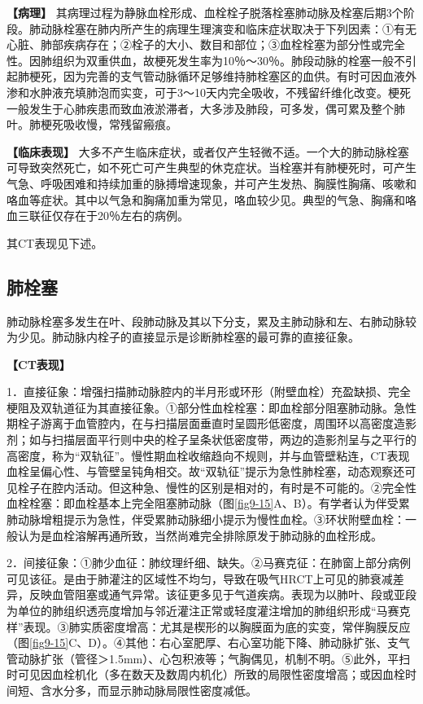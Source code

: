 \textbf{【病理】}
其病理过程为静脉血栓形成、血栓栓子脱落栓塞肺动脉及栓塞后期3个阶段。肺动脉栓塞在肺内所产生的病理生理演变和临床症状取决于下列因素：①有无心脏、肺部疾病存在；②栓子的大小、数目和部位；③血栓栓塞为部分性或完全性。因肺组织为双重供血，故梗死发生率为10％～30％。肺段动脉的栓塞一般不引起肺梗死，因为完善的支气管动脉循环足够维持肺栓塞区的血供。有时可因血液外渗和水肿液充填肺泡而实变，可于3～10天内完全吸收，不残留纤维化改变。梗死一般发生于心肺疾患而致血液淤滞者，大多涉及肺段，可多发，偶可累及整个肺叶。肺梗死吸收慢，常残留瘢痕。

\textbf{【临床表现】}
大多不产生临床症状，或者仅产生轻微不适。一个大的肺动脉栓塞可导致突然死亡，如不死亡可产生典型的休克症状。当栓塞并有肺梗死时，可产生气急、呼吸困难和持续加重的脉搏增速现象，并可产生发热、胸膜性胸痛、咳嗽和咯血等症状。其中以气急和胸痛加重为常见，咯血较少见。典型的气急、胸痛和咯血三联征仅存在于20％左右的病例。

其CT表现见下述。

\subsection{肺栓塞}

肺动脉栓塞多发生在叶、段肺动脉及其以下分支，累及主肺动脉和左、右肺动脉较为少见。肺动脉内栓子的直接显示是诊断肺栓塞的最可靠的直接征象。

\textbf{【CT表现】}

1．直接征象：增强扫描肺动脉腔内的半月形或环形（附壁血栓）充盈缺损、完全梗阻及双轨道征为其直接征象。①部分性血栓栓塞：即血栓部分阻塞肺动脉。急性期栓子游离于血管腔内，在与扫描层面垂直时呈圆形低密度，周围环以高密度造影剂；如与扫描层面平行则中央的栓子呈条状低密度带，两边的造影剂呈与之平行的高密度，称为“双轨征”。慢性期血栓收缩趋向不规则，并与血管壁粘连，CT表现血栓呈偏心性、与管壁呈钝角相交。故“双轨征”提示为急性肺栓塞，动态观察还可见栓子在腔内活动。但这种急、慢性的区别是相对的，有时是不可能的。②完全性血栓栓塞：即血栓基本上完全阻塞肺动脉（图\ref{fig9-15}A、B）。有学者认为伴受累肺动脉增粗提示为急性，伴受累肺动脉细小提示为慢性血栓。③环状附壁血栓：一般认为是血栓溶解再通所致，当然尚难完全排除原发于肺动脉的血栓形成。

2．间接征象：①肺少血征：肺纹理纤细、缺失。②马赛克征：在肺窗上部分病例可见该征。是由于肺灌注的区域性不均匀，导致在吸气HRCT上可见的肺衰减差异，反映血管阻塞或通气异常。该征更多见于气道疾病。表现为以肺叶、段或亚段为单位的肺组织透亮度增加与邻近灌注正常或轻度灌注增加的肺组织形成“马赛克样”表现。③肺实质密度增高：尤其是楔形的以胸膜面为底的实变，常伴胸膜反应（图\ref{fig9-15}C、D）。④其他：右心室肥厚、右心室功能下降、肺动脉扩张、支气管动脉扩张（管径＞1.5mm）、心包积液等；气胸偶见，机制不明。⑤此外，平扫时可见因血栓机化（多在数天及数周内机化）所致的局限性密度增高；或因血栓时间短、含水分多，而显示肺动脉局限性密度减低。

